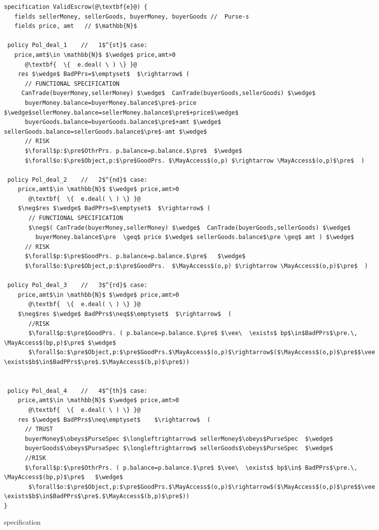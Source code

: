 \begin{figure*}
\begin{lstlisting}[escapechar=@]
specification ValidEscrow(@\textbf{e}@) {
   fields sellerMoney, sellerGoods, buyerMoney, buyerGoods //  Purse-s
   fields price, amt   // $\mathbb{N}$

 policy Pol_deal_1    //   1$^{st}$ case:
   price,amt$\in \mathbb{N}$ $\wedge$ price,amt>0
      @\textbf{  \{  e.deal( \ ) \} }@
    res $\wedge$ BadPPrs=$\emptyset$  $\rightarrow$ (
      // FUNCTIONAL SPECIFICATION
     CanTrade(buyerMoney,sellerMoney) $\wedge$  CanTrade(buyerGoods,sellerGoods) $\wedge$
      buyerMoney.balance=buyerMoney.balance$\pre$-price $\wedge$sellerMoney.balance=sellerMoney.balance$\pre$+price$\wedge$
      buyerGoods.balance=buyerGoods.balance$\pre$+amt $\wedge$ sellerGoods.balance=sellerGoods.balance$\pre$-amt $\wedge$
      // RISK
      $\forall$p:$\pre$OthrPrs. p.balance=p.balance.$\pre$  $\wedge$
      $\forall$o:$\pre$Object,p:$\pre$GoodPrs. $\MayAccess$(o,p) $\rightarrow \MayAccess$(o,p)$\pre$  )
      
 policy Pol_deal_2    //   2$^{nd}$ case:
    price,amt$\in \mathbb{N}$ $\wedge$ price,amt>0
       @\textbf{  \{  e.deal( \ ) \} }@
    $\neg$res $\wedge$ BadPPrs=$\emptyset$  $\rightarrow$ (
       // FUNCTIONAL SPECIFICATION
       $\neg$( CanTrade(buyerMoney,sellerMoney) $\wedge$  CanTrade(buyerGoods,sellerGoods) $\wedge$
         buyerMoney.balance$\pre  \geq$ price $\wedge$ sellerGoods.balance$\pre \geq$ amt ) $\wedge$
      // RISK
      $\forall$p:$\pre$GoodPrs. p.balance=p.balance.$\pre$   $\wedge$
      $\forall$o:$\pre$Object,p:$\pre$GoodPrs.  $\MayAccess$(o,p) $\rightarrow \MayAccess$(o,p)$\pre$  )
 
 policy Pol_deal_3    //   3$^{rd}$ case:
    price,amt$\in \mathbb{N}$ $\wedge$ price,amt>0
       @\textbf{  \{  e.deal( \ ) \} }@
    $\neg$res $\wedge$ BadPPrs$\neq$$\emptyset$  $\rightarrow$  (
       //RISK
       $\forall$p:$\pre$GoodPrs. ( p.balance=p.balance.$\pre$ $\vee\  \exists$ bp$\in$BadPPrs$\pre.\, \MayAccess$(bp,p)$\pre$ $\wedge$
       $\forall$o:$\pre$Object,p:$\pre$GoodPrs.$\MayAccess$(o,p)$\rightarrow$($\MayAccess$(o,p)$\pre$$\vee \exists$b$\in$BadPPrs$\pre$.$\MayAccess$(b,p)$\pre$))


 policy Pol_deal_4    //   4$^{th}$ case:
    price,amt$\in \mathbb{N}$ $\wedge$ price,amt>0
       @\textbf{  \{  e.deal( \ ) \} }@
    res $\wedge$ BadPPrs$\neq\emptyset$    $\rightarrow$  (
      // TRUST
      buyerMoney$\obeys$PurseSpec $\longleftrightarrow$ sellerMoney$\obeys$PurseSpec  $\wedge$
      buyerGoods$\obeys$PurseSpec $\longleftrightarrow$ sellerGoods$\obeys$PurseSpec  $\wedge$
      //RISK
      $\forall$p:$\pre$OthrPrs. ( p.balance=p.balance.$\pre$ $\vee\  \exists$ bp$\in$ BadPPrs$\pre.\, \MayAccess$(bp,p)$\pre$   $\wedge$
       $\forall$o:$\pre$Object,p:$\pre$GoodPrs.$\MayAccess$(o,p)$\rightarrow$($\MayAccess$(o,p)$\pre$$\vee \exists$b$\in$BadPPrs$\pre$.$\MayAccess$(b,p)$\pre$))
}
\end{lstlisting}
\caption{ specification}
\label{fig:ValidEscrow}
\end{figure*}



